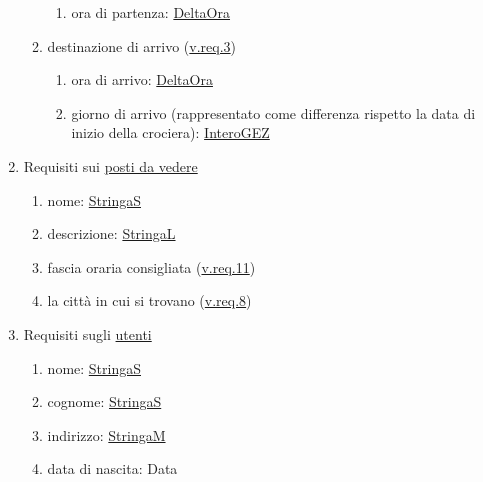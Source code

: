 \documentclass{article}
\begin{document}
\begin{enumerate}
\begin{enumerate}
        \begin{enumerate}
            \item ora di partenza: \hyperref[sec:DeltaOra]{DeltaOra}\label{sec:RequisitiItinerarioDestinazioneDiPartenzaOra}
        \end{enumerate}
        \item destinazione di arrivo (\hyperref[sec:RequisitiDestinazione]{v.req.3})\label{sec:RequisitiItinerarioDestinazioneDiArrivo}
        \begin{enumerate}
            \item ora di arrivo: \hyperref[sec:DeltaOra]{DeltaOra}\label{sec:RequisitiItinerarioDestinazioneDiArrivoOra}
            \item giorno di arrivo (rappresentato come differenza rispetto la data di inizio della crociera): \hyperref[sec:InteroGEZ]{InteroGEZ}\label{sec:RequisitiItinerarioPortoDiArrivoGiorno}
        \end{enumerate}
    \end{enumerate}
    \item Requisiti sui \hyperref[sec:PostoDaVedere]{posti da vedere}\label{sec:RequisitiPostoDaVedere}
    \begin{enumerate}
        \item nome: \hyperref[sec:StringaS]{StringaS}\label{sec:RequisitiPostoDaVedereNome}
        \item descrizione: \hyperref[sec:StringaL]{StringaL}\label{sec:RequisitiPostoDaVedereDescrizione}
        \item fascia oraria consigliata (\hyperref[sec:RequisitiOrarioPostoDaVedere]{v.req.11})\label{sec:RequisitiPostoDaVedereFasciaOrariaConsigliata}
        \item la città in cui si trovano (\hyperref[sec:RequisitiCittà]{v.req.8})\label{sec:RequisitiPostoDaVedereCittà}
    \end{enumerate}
    \item Requisiti sugli \hyperref[sec:Utente]{utenti}\label{sec:RequisitiUtente}
    \begin{enumerate}
        \item nome: \hyperref[sec:StringaS]{StringaS}\label{sec:RequisitiUtenteNome}
        \item cognome: \hyperref[sec:StringaS]{StringaS}\label{sec:RequisitiUtenteCognome}
        \item indirizzo: \hyperref[sec:StringaM]{StringaM}\label{sec:RequisitiUtenteIndirizzo}
        \item data di nascita: Data\label{sec:RequisitiUtenteDataDiNascita}

\end{enumerate}
\end{enumerate}
\end{document}

